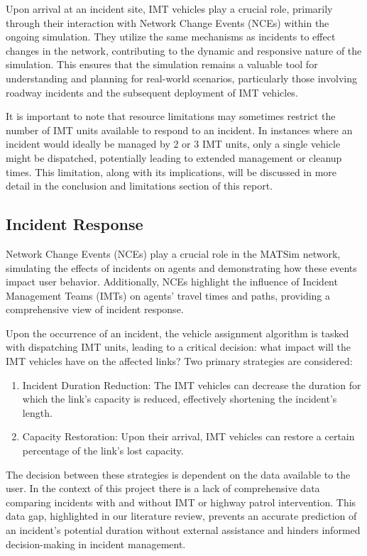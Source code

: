 \documentclass[fancy, oneside, mastersfancy, ms]{byuthesis}
\providecommand{\tightlist}{%
  \setlength{\itemsep}{0pt}\setlength{\parskip}{0pt}}\usepackage{longtable,booktabs,array}
\begin{document}
Upon arrival at an incident site, IMT vehicles play a crucial role,
primarily through their interaction with Network Change Events (NCEs)
within the ongoing simulation. They utilize the same mechanisms as
incidents to effect changes in the network, contributing to the dynamic
and responsive nature of the simulation. This ensures that the
simulation remains a valuable tool for understanding and planning for
real-world scenarios, particularly those involving roadway incidents and
the subsequent deployment of IMT vehicles.

It is important to note that resource limitations may sometimes restrict
the number of IMT units available to respond to an incident. In
instances where an incident would ideally be managed by 2 or 3 IMT
units, only a single vehicle might be dispatched, potentially leading to
extended management or cleanup times. This limitation, along with its
implications, will be discussed in more detail in the conclusion and
limitations section of this report.

\hypertarget{incident-response}{%
\subsection{Incident Response}\label{incident-response}}

Network Change Events (NCEs) play a crucial role in the MATSim network,
simulating the effects of incidents on agents and demonstrating how
these events impact user behavior. Additionally, NCEs highlight the
influence of Incident Management Teams (IMTs) on agents' travel times
and paths, providing a comprehensive view of incident response.

Upon the occurrence of an incident, the vehicle assignment algorithm is
tasked with dispatching IMT units, leading to a critical decision: what
impact will the IMT vehicles have on the affected links? Two primary
strategies are considered:

\begin{enumerate}
\def\labelenumi{\arabic{enumi}.}
\tightlist
\item
  Incident Duration Reduction: The IMT vehicles can decrease the
  duration for which the link's capacity is reduced, effectively
  shortening the incident's length.
\item
  Capacity Restoration: Upon their arrival, IMT vehicles can restore a
  certain percentage of the link's lost capacity.
\end{enumerate}

The decision between these strategies is dependent on the data available
to the user. In the context of this project there is a lack of
comprehensive data comparing incidents with and without IMT or highway
patrol intervention. This data gap, highlighted in our literature
review, prevents an accurate prediction of an incident's potential
duration without external assistance and hinders informed
decision-making in incident management.
\end{document}
